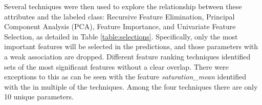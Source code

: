 \documentclass[letterpaper, notitlepage]{report}
\begin{document}
Several techniques were then used to explore the relationship between these attributes and the labeled class: Recursive Feature Elimination, Principal Component Analysis (PCA), Feature Importance, and Univariate Feature Selection, as detailed in Table \ref{table:selections}.  Specifically, only the most important features will be selected in the predictions, and those parameters with a weak association are dropped. Different feature ranking techniques identified sets of the most significant features without a clear overlap. There were exceptions to this as can be seen with the feature \textit{saturation\_mean} identified with the in multiple of the techniques. Among the four techniques there are only 10 unique parameters.

%
%
%
% 

{
\begin{small}
\renewcommand{\arraystretch}{0.9}
\setlength\LTleft{0pt}
\setlength\LTright{0pt}






\end{small}
}
\end{document}

